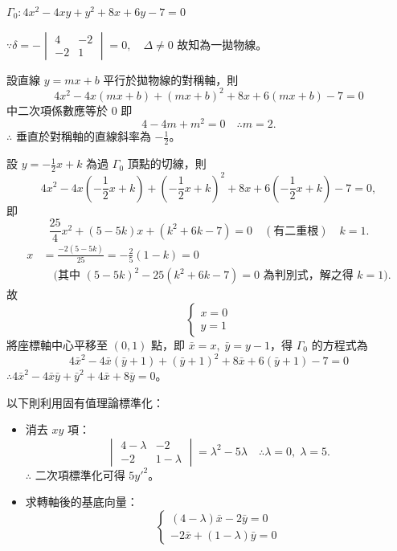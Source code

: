 \begin{example}
$\Gamma_0: 4x^2-4xy+y^2+8x+6y-7=0$

$\because \delta = -\begin{vmatrix} 4 & -2 \\ -2 & 1 \end{vmatrix} = 0, \quad \Delta \neq 0$ 故知為一拋物線。

設直線 $y=mx+b$ 平行於拋物線的對稱軸，則
\[
4x^2-4x(mx+b)+(mx+b)^2+8x+6(mx+b)-7=0
\]
中二次項係數應等於 0 即
\[
4-4m+m^2=0 \quad \therefore m=2.
\]
$\therefore$ 垂直於對稱軸的直線斜率為 $-\frac{1}{2}$。

設 $y=-\frac{1}{2}x+k$ 為過 $\Gamma_0$ 頂點的切線，則
\[
4x^2-4x\left(-\frac{1}{2}x+k\right)+\left(-\frac{1}{2}x+k\right)^2+8x+6\left(-\frac{1}{2}x+k\right)-7=0,
\]
即
\[
\frac{25}{4}x^2+(5-5k)x+(k^2+6k-7)=0 \quad (\text{有二重根}) \quad k=1.
\]
\begin{align*}
x &= \frac{-2(5-5k)}{25} = -\frac{2}{5}(1-k) = 0 \\
&\quad \bigl(\text{其中 } (5-5k)^2-25(k^2+6k-7)=0 \text{ 為判別式，解之得 } k=1\bigr).
\end{align*}
故
\[
\begin{cases}
x=0 \\
y=1
\end{cases}
\]
將座標軸中心平移至 $(0, 1)$ 點，即 $\bar{x}=x, \; \bar{y}=y-1$，得 $\Gamma_0$ 的方程式為
\[
4\bar{x}^2-4\bar{x}(\bar{y}+1)+(\bar{y}+1)^2+8\bar{x}+6(\bar{y}+1)-7=0
\]
$\therefore 4\bar{x}^2-4\bar{x}\bar{y}+\bar{y}^2+4\bar{x}+8\bar{y}=0$。

以下則利用固有值理論標準化：
\begin{itemize}[leftmargin=2em]
  \item[(i)] 消去 $xy$ 項：
  \[
  \begin{vmatrix}
  4-\lambda & -2 \\
  -2 & 1-\lambda
  \end{vmatrix} = \lambda^2-5\lambda \quad \therefore \lambda=0, \; \lambda=5.
  \]
  $\therefore$ 二次項標準化可得 $5{y'}^2$。

  \item[(ii)] 求轉軸後的基底向量：
  \[
  \begin{cases}
  (4-\lambda)\bar{x}-2\bar{y} = 0 \\
  -2\bar{x}+(1-\lambda)\bar{y} = 0
  \end{cases}
  \]
\end{itemize}

\begin{center}
\end{center}
\end{example}
